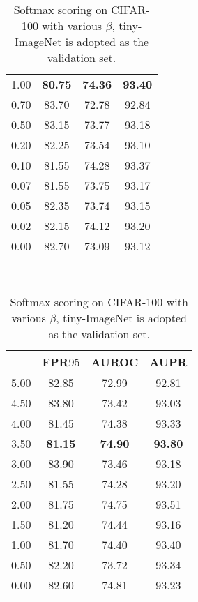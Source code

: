 \documentclass{article}
\begin{document}
\begin{table}[t]
{{\begin{tabular}{c|ccc}
\cellcolor{greyC}1.00               & \cellcolor{greyC}\textbf{80.75}                  & \cellcolor{greyC}\textbf{74.36}                  & \cellcolor{greyC}\textbf{93.40}       \\
0.70               & 83.70                  & 72.78                  & 92.84       \\
0.50               & 83.15                  & 73.77                  & 93.18       \\ 
0.20               & 82.25                  & 73.54                  & 93.10       \\
0.10               & 81.55                  & 74.28                  & 93.37       \\
0.07               & 81.55                  & 73.75                  & 93.17       \\
0.05               & 82.35                  & 73.74                  & 93.15       \\ 
0.02               & 82.15                  & 74.12                  & 93.20       \\
0.00               & 82.70                       & 73.09                        & 93.12             \\
\bottomrule[1.5pt]      
\end{tabular}
}
}~~
\parbox{.30\linewidth}{
\centering
\caption{Softmax scoring on CIFAR-100 with various $\beta$, tiny-ImageNet is adopted as the validation set.} \label{tab: 43}
\scriptsize
\vspace{5pt}
{
\begin{tabular}{c|ccc}
\toprule[1.5pt]
             & FPR$95$     & AUROC       & AUPR     \\
\midrule[0.6pt]
5.00               & 82.85                  & 72.99                  & 92.81 \\
4.50               & 83.80                  & 73.42                  & 93.03 \\
4.00               & 81.45                  & 74.38                  & 93.33 \\
\cellcolor{greyC}3.50               & \cellcolor{greyC}\textbf{81.15}                  & \cellcolor{greyC}\textbf{74.90}                  & \cellcolor{greyC}\textbf{93.80}      \\
3.00               & 83.90                  & 73.46                  & 93.18 \\
2.50               & 81.55                  & 74.28                  & 93.20 \\
2.00               & 81.75                  & 74.75                  & 93.51 \\
1.50               & 81.20                  & 74.44                  & 93.16 \\
1.00               & 81.70                  & 74.40                  & 93.40 \\
0.50               & 82.20                  & 73.72                  & 93.34 \\
0.00               & 82.60                 & 74.81                        & 93.23       \\
\bottomrule[1.5pt]      
\end{tabular}
}
}
\end{table}
\end{document}
